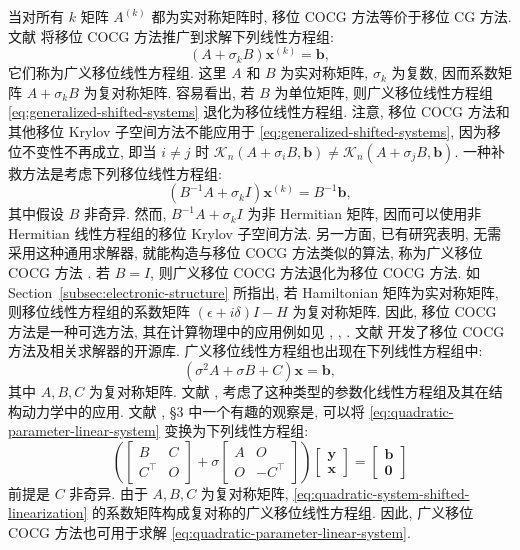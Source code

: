 {当对所有 $k$ 矩阵 $A^{(k)}$ 都为实对称矩阵时, 移位 COCG 方法等价于移位 CG 方法.}
{文献  将移位 COCG 方法推广到求解下列线性方程组:}
\begin{equation}\label{eq:generalized-shifted-systems}\label{srcpage:printed-172}(A+\sigma_kB)\bm x^{(k)}=\bm b,\end{equation}
{它们称为广义移位线性方程组. 这里 $A$ 和 $B$ 为实对称矩阵, $\sigma_k$ 为复数, 因而系数矩阵 $A+\sigma_kB$ 为复对称矩阵. 容易看出, 若 $B$ 为单位矩阵, 则广义移位线性方程组 \eqref{eq:generalized-shifted-systems} 退化为移位线性方程组.}
{注意, 移位 COCG 方法和其他移位 Krylov 子空间方法不能应用于 \eqref{eq:generalized-shifted-systems}, 因为移位不变性不再成立, 即当 $i\ne j$ 时 $\mathcal K_n(A+\sigma_iB,\bm b)\ne\mathcal K_n(A+\sigma_jB,\bm b)$. 一种补救方法是考虑下列移位线性方程组:}
\[(B^{-1}A+\sigma_k I)\bm x^{(k)}=B^{-1}\bm b,\]
{其中假设 $B$ 非奇异. 然而, $B^{-1}A+\sigma_k I$ 为非 Hermitian 矩阵, 因而可以使用非 Hermitian 线性方程组的移位 Krylov 子空间方法. 另一方面, 已有研究表明, 无需采用这种通用求解器, 就能构造与移位 COCG 方法类似的算法, 称为广义移位 COCG 方法 . 若 $B=I$, 则广义移位 COCG 方法退化为移位 COCG 方法.}
{如 Section\ \ref{subsec:electronic-structure} 所指出, 若 Hamiltonian 矩阵为实对称矩阵, 则移位线性方程组的系数矩阵 $(\epsilon+i\delta)I-H$ 为复对称矩阵. 因此, 移位 COCG 方法是一种可选方法, 其在计算物理中的应用例如见 , , . 文献  开发了移位 COCG 方法及相关求解器的开源库.}
{广义移位线性方程组也出现在下列线性方程组中:}
\begin{equation}\label{eq:quadratic-parameter-linear-system}(\sigma^2A+\sigma B+C)\bm x=\bm b,\end{equation}
{其中 $A,B,C$ 为复对称矩阵. 文献 ,  考虑了这种类型的参数化线性方程组及其在结构动力学中的应用. 文献 , \S3 中一个有趣的观察是, 可以将 \eqref{eq:quadratic-parameter-linear-system} 变换为下列线性方程组:}
\begin{equation}\label{eq:quadratic-system-shifted-linearization}\left(\begin{bmatrix}B&C\\C^{\top}&O\end{bmatrix}+\sigma\begin{bmatrix}A&O\\O&-C^{\top}\end{bmatrix}\right)\begin{bmatrix}\bm y\\\bm x\end{bmatrix}=\begin{bmatrix}\bm b\\\bm0\end{bmatrix}\end{equation}
{前提是 $C$ 非奇异. 由于 $A,B,C$ 为复对称矩阵, \eqref{eq:quadratic-system-shifted-linearization} 的系数矩阵构成复对称的广义移位线性方程组. 因此, 广义移位 COCG 方法也可用于求解 \eqref{eq:quadratic-parameter-linear-system}.}
